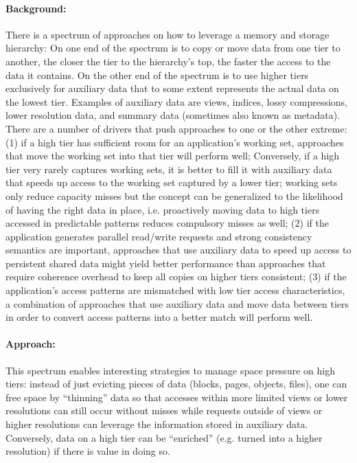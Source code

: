 \paragraph{Background:} There is a spectrum of approaches on how
to leverage a memory and storage hierarchy: On one end of the
spectrum is to copy or move data from one tier to another, the
closer the tier to the hierarchy's top, the faster the access to
the data it contains. On the other end of the spectrum is to use
higher tiers exclusively for auxiliary data that to some extent
represents the actual data on the lowest tier. Examples of auxiliary
data are views, indices, lossy compressions, lower resolution data,
and summary data (sometimes also known as metadata). There are a
number of drivers that push approaches to one or the other extreme:
(1) if a high tier has sufficient room for an application's working
set, approaches that move the working set into that tier will perform
well; Conversely, if a high tier very rarely captures working sets,
it is better to fill it with auxiliary data that speeds up access
to the working set captured by a lower tier; working sets only
reduce capacity misses but the concept can be generalized to the
likelihood of having the right data in place, i.e. proactively
moving data to high tiers accessed in predictable patterns reduces
compulsory misses as well; (2) if the application generates parallel
read/write requests and strong consistency semantics are important,
approaches that use auxiliary data to speed up access to persistent
shared data might yield better performance than approaches that
require coherence overhead to keep all copies on higher tiers
consistent; (3) if the application's access patterns are mismatched
with low tier access characteristics, a combination of approaches
that use auxiliary data and move data between tiers in order to
convert access patterns into a better match will perform well.

\paragraph{Approach:} This spectrum enables interesting strategies
to manage space pressure on high tiers: instead of just evicting
pieces of data (blocks, pages, objects, files), one can free space
by ``thinning'' data so that accesses within more limited views or
lower resolutions can still occur without misses while requests
outside of views or higher resolutions can leverage the information
stored in auxiliary data. Conversely, data on a high tier can be
``enriched'' (e.g. turned into a higher resolution) if there is
value in doing so.

